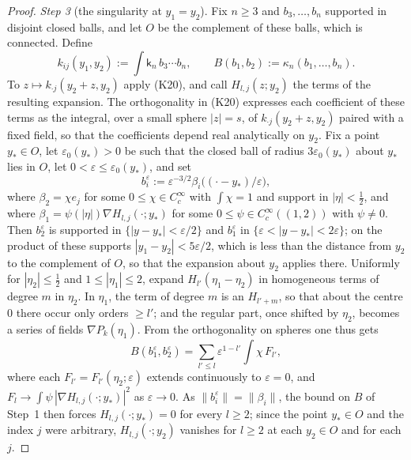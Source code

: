 \documentclass[11pt]{amsart}
\theoremstyle{definition}
\begin{document}
\begin{proof}
\emph{Step 3} (the singularity at $y_1=y_2$).
Fix $n\ge3$ and $b_3,\dots,b_n$ supported in disjoint closed balls, and let $O$ be the complement of these balls, which is connected.
Define
\begin{equation*}
k_{ij}(y_1,y_2):=\int\mathsf k_n\,b_3\cdots b_n,\qquad B(b_1,b_2):=\kappa_n(b_1,\dots,b_n).
\end{equation*}
To $z\mapsto k_{\cdot j}(y_2+z,y_2)$ apply (K20), and call $H_{l,j}(z;y_2)$ the terms of the resulting expansion.
The orthogonality in (K20) expresses each coefficient of these terms as the integral, over a small sphere $|z|=s$, of $k_{\cdot j}(y_2+z,y_2)$ paired with a fixed field, so that the coefficients depend real analytically on $y_2$.
Fix a point $y_*\in O$, let $\varepsilon_0(y_*)>0$ be such that the closed ball of radius $3\varepsilon_0(y_*)$ about $y_*$ lies in $O$, let $0<\varepsilon\le\varepsilon_0(y_*)$, and set
\begin{equation*}
b_i^\varepsilon:=\varepsilon^{-3/2}\beta_i\bigl((\cdot-y_*)/\varepsilon\bigr),
\end{equation*}
where $\beta_2=\chi e_j$ for some $0\le\chi\in C_c^\infty$ with $\int\chi=1$ and support in $|\eta|<\frac12$, and where $\beta_1=\psi(|\eta|)\nabla H_{l,j}(\cdot;y_*)$ for some $0\le\psi\in C_c^\infty((1,2))$ with $\psi\ne0$.
Then $b_2^\varepsilon$ is supported in $\{|y-y_*|<\varepsilon/2\}$ and $b_1^\varepsilon$ in $\{\varepsilon<|y-y_*|<2\varepsilon\}$;
on the product of these supports $|y_1-y_2|<5\varepsilon/2$, which is less than the distance from $y_2$ to the complement of $O$, so that the expansion about $y_2$ applies there.
Uniformly for $|\eta_2|\le\frac12$ and $1\le|\eta_1|\le2$, expand $H_{l'}(\eta_1-\eta_2)$ in homogeneous terms of degree $m$ in $\eta_2$.
In $\eta_1$, the term of degree $m$ is an $H_{l'+m}$, so that about the centre $0$ there occur only orders $\ge l'$; and the regular part, once shifted by $\eta_2$, becomes a series of fields $\nabla P_k(\eta_1)$.
From the orthogonality on spheres one thus gets
\begin{equation*}
B(b_1^\varepsilon,b_2^\varepsilon)=\sum_{l'\le l}\varepsilon^{1-l'}\int\chi\,F_{l'},
\end{equation*}
where each $F_{l'}=F_{l'}(\eta_2;\varepsilon)$ extends continuously to $\varepsilon=0$, and $F_l\to\int\psi\,|\nabla H_{l,j}(\cdot;y_*)|^2$ as $\varepsilon\to0$.
As $\|b_i^\varepsilon\|=\|\beta_i\|$, the bound on $B$ of Step~1 then forces $H_{l,j}(\cdot;y_*)=0$ for every $l\ge2$;
since the point $y_*\in O$ and the index $j$ were arbitrary, $H_{l,j}(\cdot;y_2)$ vanishes for $l\ge2$ at each $y_2\in O$ and for each $j$.


\end{proof}
\end{document}
